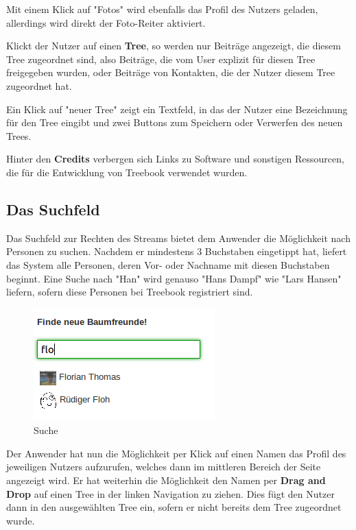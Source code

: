 \documentclass[10pt,a4paper]{book}
\makeatletter
\def\ScaleIfNeeded{%
\ifdim\Gin@nat@width>\linewidth
\linewidth
\else
\Gin@nat@width
\fi
}
\makeatother
\begin{document}
Mit einem Klick auf "Fotos" wird ebenfalls das Profil des Nutzers geladen, allerdings wird direkt der Foto-Reiter aktiviert.

Klickt der Nutzer auf einen \textbf{Tree}, so werden nur Beiträge angezeigt, die diesem Tree zugeordnet sind, also Beiträge, die vom User explizit für diesen Tree freigegeben wurden, oder Beiträge von Kontakten, die der Nutzer diesem Tree zugeordnet hat.

Ein Klick auf "neuer Tree" zeigt ein Textfeld, in das der Nutzer eine Bezeichnung für den Tree eingibt und zwei Buttons zum Speichern oder Verwerfen des neuen Trees.

Hinter den \textbf{Credits} verbergen sich Links zu Software und sonstigen Ressourcen, die für die Entwicklung von Treebook verwendet wurden.

\subsection{Das Suchfeld}
Das Suchfeld zur Rechten des Streams bietet dem Anwender die Möglichkeit nach Personen zu suchen. Nachdem er mindestens 3 Buchstaben eingetippt hat, liefert das System alle Personen, deren Vor- oder Nachname mit diesen Buchstaben beginnt. Eine Suche nach "Han" wird genauso "Hans Dampf" wie "Lars Hansen" liefern, sofern diese Personen bei Treebook registriert sind.
\begin{figure}[htbp]
\centering
\includegraphics[width=\ScaleIfNeeded]{Pictures/screen_search.png}%
\caption{Suche}%
\end{figure}
Der Anwender hat nun die Möglichkeit per Klick auf einen Namen das Profil des jeweiligen Nutzers aufzurufen, welches dann im mittleren Bereich der Seite angezeigt wird.
Er hat weiterhin die Möglichkeit den Namen per \textbf{Drag and Drop} auf einen Tree in der linken Navigation zu ziehen. Dies fügt den Nutzer dann in den ausgewählten Tree ein, sofern er nicht bereits dem Tree zugeordnet wurde.
\end{document}
